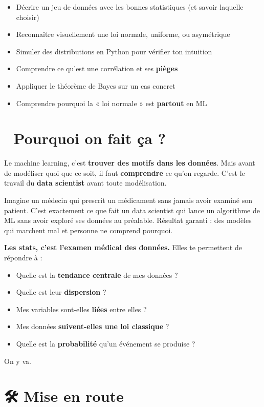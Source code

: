 \documentclass[
  french,
  11pt,
  a4paper,
]{scrbook}
\providecommand{\tightlist}{%
  \setlength{\itemsep}{0pt}\setlength{\parskip}{0pt}}
\begin{document}
\begin{itemize}
\tightlist
\item
  Décrire un jeu de données avec les bonnes statistiques (et savoir
  laquelle choisir)
\item
  Reconnaître visuellement une loi normale, uniforme, ou asymétrique
\item
  Simuler des distributions en Python pour vérifier ton intuition
\item
  Comprendre ce qu'est une corrélation et ses \textbf{pièges}
\item
  Appliquer le théorème de Bayes sur un cas concret
\item
  Comprendre pourquoi la « loi normale » est \textbf{partout} en ML
\end{itemize}

\section{🎯 Pourquoi on fait ça ?}\label{pourquoi-on-fait-uxe7a-2}

Le machine learning, c'est \textbf{trouver des motifs dans les données}.
Mais avant de modéliser quoi que ce soit, il faut \textbf{comprendre} ce
qu'on regarde. C'est le travail du \textbf{data scientist} avant toute
modélisation.

Imagine un médecin qui prescrit un médicament sans jamais avoir examiné
son patient. C'est exactement ce que fait un data scientist qui lance un
algorithme de ML sans avoir exploré ses données au préalable. Résultat
garanti : des modèles qui marchent mal et personne ne comprend pourquoi.

\textbf{Les stats, c'est l'examen médical des données.} Elles te
permettent de répondre à :

\begin{itemize}
\tightlist
\item
  Quelle est la \textbf{tendance centrale} de mes données ?
\item
  Quelle est leur \textbf{dispersion} ?
\item
  Mes variables sont-elles \textbf{liées} entre elles ?
\item
  Mes données \textbf{suivent-elles une loi classique} ?
\item
  Quelle est la \textbf{probabilité} qu'un événement se produise ?
\end{itemize}

On y va.

\section{🛠️ Mise en route}\label{mise-en-route-2}
\end{document}
